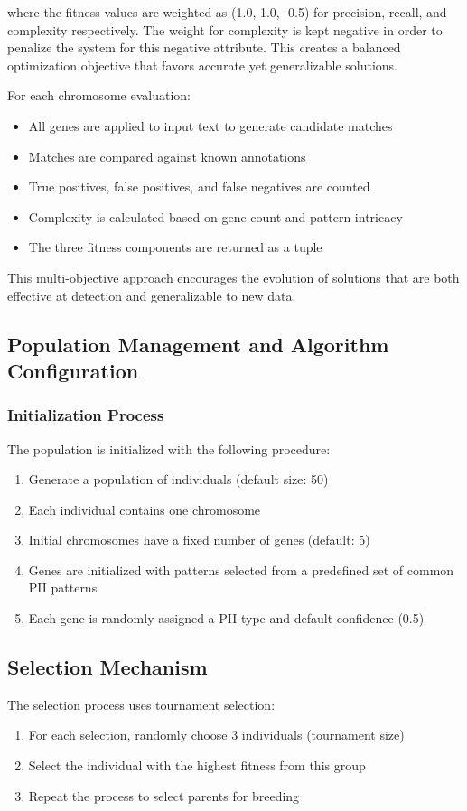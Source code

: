 \documentclass[conference]{IEEEtran}
\begin{document}
where the fitness values are weighted as (1.0, 1.0, -0.5) for precision, recall, and complexity respectively. The weight for complexity is kept negative in order to penalize the system for this negative attribute.
This creates a balanced optimization objective that favors accurate yet generalizable solutions.

For each chromosome evaluation:
\begin{itemize}
\item All genes are applied to input text to generate candidate matches
\item Matches are compared against known annotations
\item True positives, false positives, and false negatives are counted
\item Complexity is calculated based on gene count and pattern intricacy
\item The three fitness components are returned as a tuple
\end{itemize}

This multi-objective approach encourages the evolution of solutions that are both effective at detection and generalizable to new data.

\subsection{\textbf{Population Management and Algorithm Configuration}}

\subsubsection{Initialization Process}
The population is initialized with the following procedure:
\begin{enumerate}
\item Generate a population of individuals (default size: 50)
\item Each individual contains one chromosome
\item Initial chromosomes have a fixed number of genes (default: 5)
\item Genes are initialized with patterns selected from a predefined set of common PII patterns
\item Each gene is randomly assigned a PII type and default confidence (0.5)
\end{enumerate}

\subsection{\textbf{Selection Mechanism}}
The selection process uses tournament selection:
\begin{enumerate}
\item For each selection, randomly choose 3 individuals (tournament size)
\item Select the individual with the highest fitness from this group
\item Repeat the process to select parents for breeding
\end{enumerate}
\end{document}
